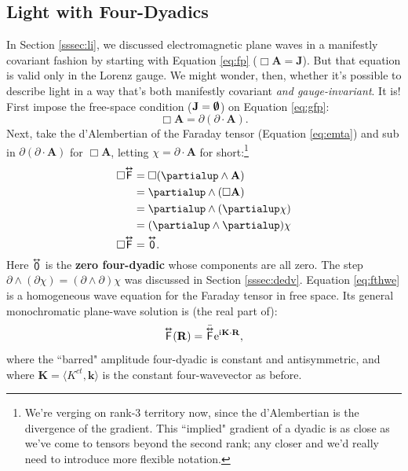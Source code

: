 \documentclass[12pt]{article}
\renewcommand{\vv}[1]{\mathbf{#1}}
\newcommand{\tightoverset}[2]{%
  \mathop{#2}\limits^{\vbox to -.5ex{\kern-0.75ex\hbox{$#1$}\vss}}}
\newcommand{\inlinedy}[1]{\tightoverset{\text{\tiny$\bm\leftrightarrow$}}{#1}}
\newcommand{\capdy}[1]{ \overset{ \text{\tiny$\bm\leftrightarrow$} }{\vphantom{\text{\small{A}}}\smash{#1}} }
\begin{document}
\subsection{Light with Four-Dyadics}

In Section \ref{sssec:li}, we discussed electromagnetic plane waves in a manifestly covariant fashion by starting with Equation \ref{eq:fp} ($\Box \vv A = \vv J$). But that equation is valid only in the Lorenz gauge. We might wonder, then, whether it's possible to describe light in a way that's both manifestly covariant \emph{and gauge-invariant}. It is! First impose the free-space condition ($\vv J = \textrm{\mbox{\boldmath $\emptyset$}}$) on Equation \ref{eq:gfp}:
\begin{equation*}
\Box \vv A = \partialup(\partialup \cdot \vv A).
\end{equation*}
Next, take the d'Alembertian of the Faraday tensor (Equation \ref{eq:emta}) and sub in $\partialup(\partialup \cdot \vv A)$ for $\Box \vv A$, letting $\chi = \partialup \cdot \vv A$ for short:\footnote{We're verging on rank-3 territory now, since the d'Alembertian is the divergence of the gradient. This ``implied" gradient of a dyadic is as close as we've come to tensors beyond the second rank; any closer and we'd really need to introduce more flexible notation.}
\begin{equation}\label{eq:fthwe}
\begin{split}
\Box \capdy{\mathsf{F}} &= \Box ( \partialup \wedge \vv A ) \\
&= \partialup \wedge ( \Box \vv A) \\
&= \partialup \wedge (\partialup \chi) \\
&= ( \partialup \wedge \partialup ) \chi \\
\Box \capdy{\mathsf{F}} &= \capdy{\mathsf{0}} .
\end{split}
\end{equation}
Here $\inlinedy{\mathsf{0}}$ is the \textbf{zero four-dyadic} whose components are all zero. The step $\partialup \wedge (\partialup \chi) = (\partialup \wedge \partialup) \chi$ was discussed in Section \ref{sssec:dedv}. Equation \ref{eq:fthwe} is a homogeneous wave equation for the Faraday tensor in free space. Its general monochromatic plane-wave solution is (the real part of):
\begin{equation}\label{eq:ftwe}
\capdy{\mathsf{F}} (\vv R) = \bar{\capdy{\mathsf{F}}} \mathrm{e}^{\mathrm{i} \mkern.5mu \vv K \cdot \vv R} ,
\end{equation}
where the ``barred" amplitude four-dyadic is constant and antisymmetric, and where $\vv K = \langle K^{ct}, \vv k \rangle$ is the constant four-wavevector as before.
\end{document}
